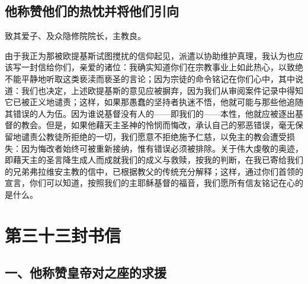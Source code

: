 
\subsection{他称赞他们的热忱并将他们引向}

致其爱子、及众隐修院院长，主教良。\par

由于我正为那被欧提基斯试图搅扰的信仰起见，派遣以协助维护真理，我认为也应该写一封信给你们，亲爱的诸位：我确实知道你们在宗教事业上如此热心，以致绝不能平静地听取这类亵渎而亵圣的言论；因为宗徒的命令铭记在你们心中，其中说道：我们也决定，上述欧提基斯的意见应被摒弃，因为我们从审阅案件记录中得知它已被正义地谴责；这样，如果那愚蠢的坚持者执迷不悟，他就可能与那些他追随其错误的人为伍。因为谁说基督没有人的——即我们的——本性，他就应被逐出基督的教会。但是，如果他藉天主圣神的怜悯而悔改，承认自己的邪恶错误，毫无保留地谴责公教徒所拒绝的一切，我们愿意不拒绝施予仁慈，以免主的教会遭受损失：因为悔改者始终可被重新接纳，惟有错误必须被排除。关于伟大虔敬的奥迹，即藉天主的圣言降生成人而成就我们的成义与救赎，按我的判断，在我已寄给我们的兄弟弗拉维安主教的信中，已根据教父的传统充分解释；这样，通过你们首领的宣言，你们可以知道，按照我们的主耶稣基督的福音，我们愿所有信友铭记在心的是什么。\par



\section{第三十三封书信}


\subsection{一、他称赞皇帝对之座的求援}

